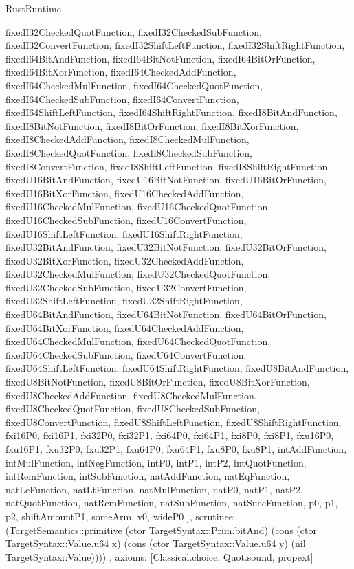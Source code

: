 \begin{lexlean}{RustRuntime}
\begin{semanticmodule}
{{      fixedI32CheckedQuotFunction,
      fixedI32CheckedSubFunction,
      fixedI32ConvertFunction,
      fixedI32ShiftLeftFunction,
      fixedI32ShiftRightFunction,
      fixedI64BitAndFunction,
      fixedI64BitNotFunction,
      fixedI64BitOrFunction,
      fixedI64BitXorFunction,
      fixedI64CheckedAddFunction,
      fixedI64CheckedMulFunction,
      fixedI64CheckedQuotFunction,
      fixedI64CheckedSubFunction,
      fixedI64ConvertFunction,
      fixedI64ShiftLeftFunction,
      fixedI64ShiftRightFunction,
      fixedI8BitAndFunction,
      fixedI8BitNotFunction,
      fixedI8BitOrFunction,
      fixedI8BitXorFunction,
      fixedI8CheckedAddFunction,
      fixedI8CheckedMulFunction,
      fixedI8CheckedQuotFunction,
      fixedI8CheckedSubFunction,
      fixedI8ConvertFunction,
      fixedI8ShiftLeftFunction,
      fixedI8ShiftRightFunction,
      fixedU16BitAndFunction,
      fixedU16BitNotFunction,
      fixedU16BitOrFunction,
      fixedU16BitXorFunction,
      fixedU16CheckedAddFunction,
      fixedU16CheckedMulFunction,
      fixedU16CheckedQuotFunction,
      fixedU16CheckedSubFunction,
      fixedU16ConvertFunction,
      fixedU16ShiftLeftFunction,
      fixedU16ShiftRightFunction,
      fixedU32BitAndFunction,
      fixedU32BitNotFunction,
      fixedU32BitOrFunction,
      fixedU32BitXorFunction,
      fixedU32CheckedAddFunction,
      fixedU32CheckedMulFunction,
      fixedU32CheckedQuotFunction,
      fixedU32CheckedSubFunction,
      fixedU32ConvertFunction,
      fixedU32ShiftLeftFunction,
      fixedU32ShiftRightFunction,
      fixedU64BitAndFunction,
      fixedU64BitNotFunction,
      fixedU64BitOrFunction,
      fixedU64BitXorFunction,
      fixedU64CheckedAddFunction,
      fixedU64CheckedMulFunction,
      fixedU64CheckedQuotFunction,
      fixedU64CheckedSubFunction,
      fixedU64ConvertFunction,
      fixedU64ShiftLeftFunction,
      fixedU64ShiftRightFunction,
      fixedU8BitAndFunction,
      fixedU8BitNotFunction,
      fixedU8BitOrFunction,
      fixedU8BitXorFunction,
      fixedU8CheckedAddFunction,
      fixedU8CheckedMulFunction,
      fixedU8CheckedQuotFunction,
      fixedU8CheckedSubFunction,
      fixedU8ConvertFunction,
      fixedU8ShiftLeftFunction,
      fixedU8ShiftRightFunction,
      fxi16P0,
      fxi16P1,
      fxi32P0,
      fxi32P1,
      fxi64P0,
      fxi64P1,
      fxi8P0,
      fxi8P1,
      fxu16P0,
      fxu16P1,
      fxu32P0,
      fxu32P1,
      fxu64P0,
      fxu64P1,
      fxu8P0,
      fxu8P1,
      intAddFunction,
      intMulFunction,
      intNegFunction,
      intP0,
      intP1,
      intP2,
      intQuotFunction,
      intRemFunction,
      intSubFunction,
      natAddFunction,
      natEqFunction,
      natLeFunction,
      natLtFunction,
      natMulFunction,
      natP0,
      natP1,
      natP2,
      natQuotFunction,
      natRemFunction,
      natSubFunction,
      natSuccFunction,
      p0,
      p1,
      p2,
      shiftAmountP1,
      someArm,
      v0,
      wideP0
    ],
    scrutinee: (TargetSemantics::primitive (ctor TargetSyntax::Prim.bitAnd) (cons (ctor TargetSyntax::Value.u64 x) (cons (ctor TargetSyntax::Value.u64 y) (nil TargetSyntax::Value))))
  },
  axioms: [Classical.choice, Quot.sound, propext]
}


\end{semanticmodule}
\end{lexlean}
